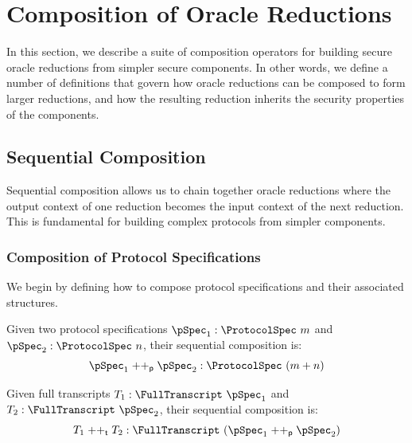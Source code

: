 \section{Composition of Oracle Reductions}\label{sec:composition_oracle_reductions}

In this section, we describe a suite of composition operators for building secure oracle reductions from simpler secure components. In other words, we define a number of definitions that govern how oracle reductions can be composed to form larger reductions, and how the resulting reduction inherits the security properties of the components.


\subsection{Sequential Composition}\label{sec:sequential_composition}

Sequential composition allows us to chain together oracle reductions where the output context of one reduction becomes the input context of the next reduction. This is fundamental for building complex protocols from simpler components.

\subsubsection{Composition of Protocol Specifications}

We begin by defining how to compose protocol specifications and their associated structures.

\begin{definition}
    \label{def:protocol_spec_append}
    Given two protocol specifications $\pSpec_1 : \ProtocolSpec\ m$ and $\pSpec_2 : \ProtocolSpec\ n$, their sequential composition is:
    \[ \pSpec_1 \mathrel{++_\mathsf{p}} \pSpec_2 : \ProtocolSpec\ (m + n) \]
    \leanok
\end{definition}

\begin{definition}
    \label{def:transcript_append}
    Given full transcripts $T_1 : \FullTranscript\ \pSpec_1$ and $T_2 : \FullTranscript\ \pSpec_2$, their sequential composition is:
    \[ T_1 \mathrel{++_\mathsf{t}} T_2 : \FullTranscript\ (\pSpec_1 \mathrel{++_\mathsf{p}} \pSpec_2) \]
    \leanok
\end{definition}

